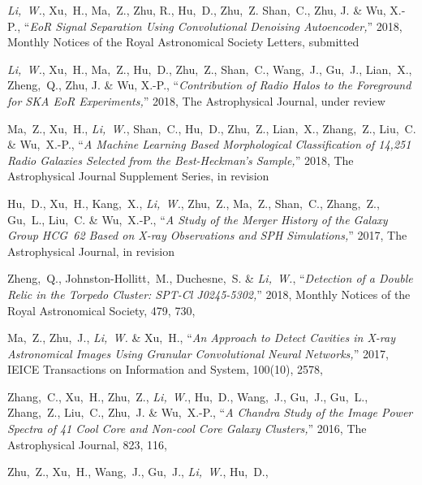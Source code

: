 
\begin{publications}{99}
  \item \emph{Li,~W.}, Xu,~H., Ma,~Z., Zhu, R., Hu,~D., Zhu,~Z.
    Shan,~C., Zhu, J. \& Wu, X.-P.,
    \enquote{\it EoR Signal Separation Using Convolutional Denoising
      Autoencoder,}
    2018, Monthly Notices of the Royal Astronomical Society Letters,
    submitted
  \item \emph{Li,~W.}, Xu,~H., Ma,~Z., Hu,~D., Zhu,~Z., Shan,~C.,
    Wang,~J., Gu,~J., Lian,~X., Zheng,~Q., Zhu, J. \& Wu, X.-P.,
    \enquote{\it Contribution of Radio Halos to the Foreground for
      SKA EoR Experiments,}
    2018, The Astrophysical Journal,
    under review
  \item Ma,~Z., Xu,~H., \emph{Li,~W.}, Shan,~C., Hu,~D., Zhu,~Z.,
    Lian,~X., Zhang,~Z., Liu,~C. \& Wu,~X.-P.,
    \enquote{\it A Machine Learning Based Morphological Classification
      of 14,251 Radio Galaxies Selected from the Best-Heckman's Sample,}
    2018, The Astrophysical Journal Supplement Series,
    in revision
  \item Hu,~D., Xu,~H., Kang,~X., \emph{Li,~W.}, Zhu,~Z., Ma,~Z.,
    Shan,~C., Zhang,~Z., Gu,~L., Liu,~C. \& Wu,~X.-P.,
    \enquote{\it A Study of the Merger History of the Galaxy Group
      HCG~62 Based on X-ray Observations and SPH Simulations,}
    2017, The Astrophysical Journal,
    in revision
  \item Zheng,~Q., Johnston-Hollitt,~M., Duchesne,~S. \& \emph{Li,~W.},
    \enquote{\it Detection of a Double Relic in the Torpedo Cluster:
      SPT-Cl J0245-5302,}
    2018, Monthly Notices of the Royal Astronomical Society, 479, 730,
  \item Ma,~Z., Zhu,~J., \emph{Li,~W.} \& Xu,~H.,
    \enquote{\it An Approach to Detect Cavities in X-ray Astronomical
      Images Using Granular Convolutional Neural Networks,}
    2017, IEICE Transactions on Information and System, 100(10), 2578,
  \item Zhang,~C., Xu,~H., Zhu,~Z., \emph{Li,~W.}, Hu,~D., Wang,~J.,
    Gu,~J., Gu,~L., Zhang,~Z., Liu,~C., Zhu,~J. \& Wu,~X.-P.,
    \enquote{\it A Chandra Study of the Image Power Spectra of 41
      Cool Core and Non-cool Core Galaxy Clusters,}
    2016, The Astrophysical Journal, 823, 116,
  \item Zhu,~Z., Xu,~H., Wang,~J., Gu,~J., \emph{Li,~W.}, Hu,~D.,

\end{publications}
